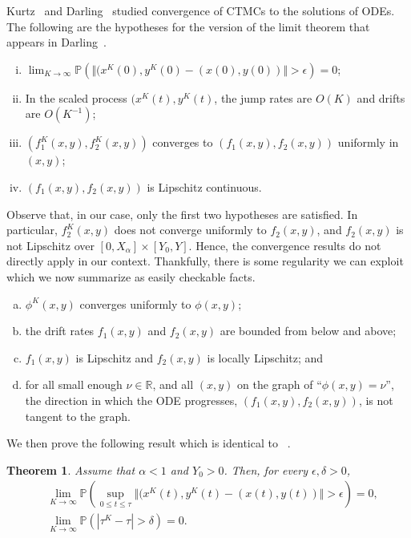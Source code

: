 \documentclass[10pt,journal,letterpaper]{IEEEtran}
\newtheorem{theorem}{Theorem}[section]
\begin{document}
Kurtz~\cite{stochproc.kurtz70limits-markov-processes} and Darling~\cite{stochproc.darling02fluid-limits}
studied convergence of CTMCs to the solutions of ODEs. The following are the hypotheses for
the version of the limit theorem that appears in Darling~\cite{stochproc.darling02fluid-limits}.
\begin{enumerate}[(i)]
\item $\lim_{K \rightarrow \infty} \mathbb{P}\left(\Vert(x^K(0),y^K(0) - (x(0),y(0))\Vert > \epsilon \right) = 0$;
\item In the scaled process $(x^K(t),y^K(t)$, the jump rates are $O(K)$ and drifts are $O(K^{-1})$;
\item $(f^K_1(x,y), f^K_2(x,y))$ converges to $(f_1(x,y), f_2(x,y))$ uniformly  in $(x,y)$;
\item $(f_1(x,y), f_2(x,y))$ is Lipschitz continuous.
\end{enumerate}
Observe that, in our case, only the first two hypotheses are satisfied.
In particular, $f^K_2(x,y)$ does not converge uniformly to $f_2(x,y)$,
and $f_2(x,y)$ is not Lipschitz over $[0, X_{\alpha}] \times [Y_0,
Y]$. Hence, the convergence results do not directly apply in
our context. Thankfully, there is some regularity we can exploit which
we now summarize as easily checkable facts.
\begin{enumerate}[(a)]
\item $\phi^K(x,y)$ converges uniformly to $\phi(x,y)$;
\item the drift rates $f_1(x,y)$ and $f_2(x,y)$ are bounded from below and above;
\item $f_1(x,y)$ is Lipschitz and $f_2(x,y)$ is locally Lipschitz; and
\item for all small enough $\nu \in \mathbb{R}$, and all $(x,y)$ on the graph of ``$\phi(x,y) = \nu$'', the direction in which the ODE
progresses, $(f_1(x,y),f_2(x,y))$, is not tangent to the graph.
\end{enumerate}
We then prove the following result which is identical to
~\cite[Theorem~2.8]{stochproc.darling02fluid-limits}.
\begin{theorem}
\label{assym-optimality}
Assume that $\alpha < 1$ and $Y_0 > 0$. Then, for every $\epsilon,\delta > 0$,
\begin{align*}
&\lim_{K \rightarrow \infty} \mathbb{P}\left(\sup_{0 \leq t \leq \tau}\Vert(x^K(t),y^K(t) - (x(t),y(t))\Vert > \epsilon \right) = 0, \\
&\lim_{K \rightarrow \infty} \mathbb{P}\left(|\tau^K - \tau| > \delta \right) = 0.
\end{align*}
\end{theorem}
\end{document}
